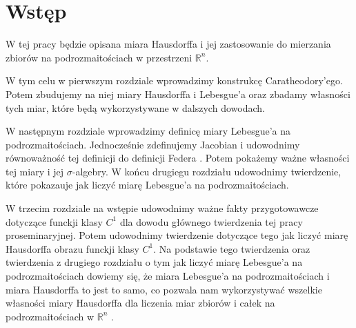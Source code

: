\chapter*{Wstęp}


W tej pracy będzie opisana miara Hausdorffa i jej zastosowanie do mierzania zbiorów na podrozmaitościach w przestrzeni $\mathbb{R}^n$.

W tym celu w pierwszym rozdziale wprowadzimy konstrukcę Caratheodory'ego. Potem zbudujemy na niej miary Hausdorffa i Lebesgue'a oraz zbadamy własności tych miar, które będą wykorzystywane w dalszych dowodach.

W następnym rozdziale wprowadzimy definicę miary Lebesgue'a na podrozmaitościach. Jednocześnie zdefinujemy Jacobian i udowodnimy równoważność tej definicji do definicji Federa \citep{Federer}. Potem pokażemy ważne własności tej miary i jej $\sigma$-algebry. W końcu drugiegu rozdziału udowodnimy twierdzenie, które pokazauje jak liczyć miarę Lebesgue'a na podrozmaitościach.

W trzecim rozdziale na wstępie udowodnimy ważne fakty przygotowawcze dotyczące funckji klasy $C^1$ 
dla dowodu głównego twierdzenia tej pracy proseminaryjnej. Potem udowodnimy twierdzenie dotyczące 
tego jak liczyć miarę Hausdorffa obrazu funckji klasy $C^1$. Na podstawie tego twierdzenia oraz 
twierdzenia z drugiego rozdziału o tym jak liczyć miarę Lebesgue'a na podrozmaitościach dowiemy się, 
że miara Lebesgue'a na podrozmaitościach i miara Hausdorffa to jest to samo, co pozwala nam wykorzystywać 
wszelkie własności miary Hausdorffa dla liczenia miar zbiorów i całek na podrozmaitościach w $\mathbb{R}^n$ .
